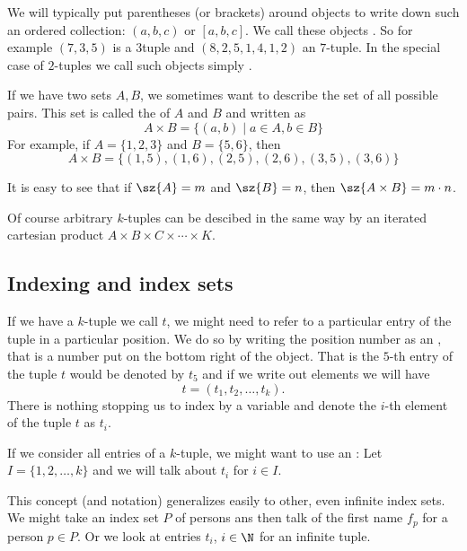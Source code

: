 We will typically put parentheses (or brackets) around objects to write down such an
ordered collection: $(a,b,c)$ or $[a,b,c]$. We call these objects . So
for example $(7,3,5)$ is a $3$tuple and $(8,2,5,1,4,1,2)$ an $7$-tuple. In the special
case of $2$-tuples we call such objects simply .
\smallskip

If we have two sets $A,B$, we sometimes want to describe the set of all possible pairs.
This set is called the  of $A$ and
$B$ and written as
\[
A\times B=\{(a,b)\mid a\in A,b\in B\}
\]
For example, if $A=\{1,2,3\}$ and $B=\{5,6\}$, then
\[
A\times B=\{(1,5),(1,6),(2,5),(2,6),(3,5),(3,6)\}
\]

It is easy to see that if $\sz{A}=m$ and $\sz{B}=n$, then $\sz{A\times B}=m\cdot n$.

Of course arbitrary $k$-tuples can be descibed in the same way by an iterated cartesian
product $A\times B\times C\times\cdots\times K$.

\subsection{Indexing and index sets}

If we have a $k$-tuple we call $t$, we might need to refer to a particular entry
of the tuple in a particular position. We do so by writing the position number as an
, that is a number put on the bottom right of the object. That is the
$5$-th entry of the tuple $t$ would be denoted by $t_5$ and if we write out elements we
will have
\[
t=(t_1,t_2,\ldots,t_k).
\]
There is nothing stopping us to index by a variable and denote the $i$-th element of
the tuple $t$ as $t_i$.

If we consider all entries of a $k$-tuple, we might want to use an
: Let $I=\{1,2,\ldots,k\}$ and we will talk about $t_i$
for $i\in I$.  

This concept (and notation) generalizes easily to other, even infinite index
sets. We might take an index set $P$ of persons ans then talk of the first
name $f_p$ for a person $p\in P$. Or we look at entries $t_i$, $i\in\N$ for
an infinite tuple.

